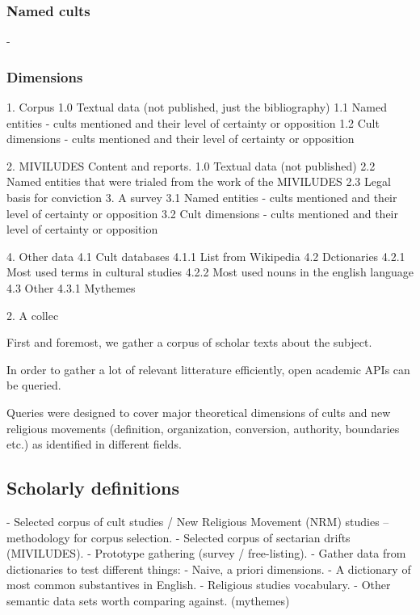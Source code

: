 \subsubsection{Named cults}
- 
\subsubsection{Dimensions}



1. Corpus
	1.0 Textual data (not published, just the bibliography)
	1.1 Named entities - cults mentioned and their level of certainty or opposition
	1.2 Cult dimensions - cults mentioned and their level of certainty or opposition

2. MIVILUDES Content and reports.
	1.0 Textual data (not published)
	2.2 Named entities that were trialed from the work of the MIVILUDES
	2.3 Legal basis for conviction
3. A survey
	3.1 Named entities - cults mentioned and their level of certainty or opposition
	3.2 Cult dimensions - cults mentioned and their level of certainty or opposition

4. Other data
 	4.1 Cult databases 
		4.1.1 List from Wikipedia
	4.2 Dctionaries
		4.2.1 Most used terms in cultural studies
		4.2.2 Most used nouns in the english language
	4.3 Other
		4.3.1 Mythemes




2. A collec

First and foremost, we gather a corpus of scholar texts about the subject. 

In order to gather a lot of relevant litterature efficiently, open academic APIs can be queried.

Queries were designed to cover major theoretical dimensions of cults and new religious movements (definition, organization, conversion, authority, boundaries etc.) as identified in different fields.




\subsection{Scholarly definitions}


  - Selected corpus of cult studies / New Religious Movement (NRM) studies
    -- methodology for corpus selection.
  - Selected corpus of sectarian drifts (MIVILUDES).
  - Prototype gathering (survey / free-listing).
- Gather data from dictionaries to test different things:
  - Naive, a priori dimensions.
  - A dictionary of most common substantives in English.
  - Religious studies vocabulary.
  - Other semantic data sets worth comparing against. (mythemes)


